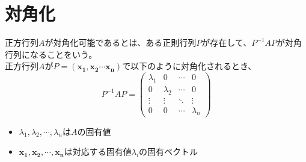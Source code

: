 \documentclass{jlreq}
\begin{document}
\section{対角化}
\begin{tcolorbox}[enhanced,title=定義1 行列の対角化, 
  attach boxed title to top left, 
  colback=white!95!blue,
  colbacktitle=white!10!blue!50!black,
  drop fuzzy shadow,
  boxrule=0.25mm,
  ]
  正方行列$A$が対角化可能であるとは、ある正則行列$P$が存在して、$P^{-1}AP$が対角行列になることをいう。 \\
  正方行列$A$が$P = (\boldsymbol{x_1}, \boldsymbol{x_2} \cdots \boldsymbol{x_n})$で以下のように対角化されるとき、
  \begin{equation*}
    P^{-1}AP = \begin{pmatrix}
      \lambda_1 & 0 & \cdots & 0 \\
      0 & \lambda_2 & \cdots & 0 \\
      \vdots & \vdots & \ddots & \vdots \\
      0 & 0 & \cdots & \lambda_n
  \end{pmatrix}
  \end{equation*}
  \begin{itemize}
    \item $\lambda_1, \lambda_2, \cdots, \lambda_n$は$A$の固有値
    \item $\boldsymbol{x_1}, \boldsymbol{x_2}, \cdots, \boldsymbol{x_n}$は対応する固有値$\lambda_i$の固有ベクトル
  \end{itemize}
\end{tcolorbox}
\end{document}
